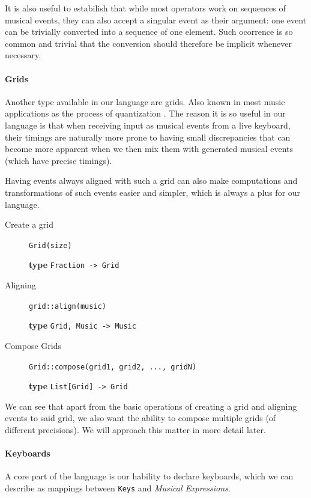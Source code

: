 \documentclass[a4paper,UKenglish,cleveref, autoref]{oasics-v2019}
\begin{document}
It is also useful to estabilish that while most operators work on sequences of musical events, they can also accept a singular event as their argument: one event can be trivially converted into a sequence of one element. Such ocorrence is so common and trivial that the conversion should therefore be implicit whenever necessary.

\paragraph*{Grids}
Another type available in our language are grids. Also known in most music applications as the process of quantization \cite{Quantization}. The reason it is so useful in our language is that when receiving input as musical events from a live keyboard, their timings are naturally more prone to having small discrepancies that can become more apparent when we then mix them with generated musical events (which have precise timings).


Having events always aligned with such a grid can also make computations and transformations of such events easier and simpler, which is always a plus for our language.


\begin{description}
    \item[Create a grid] \verb|Grid(size)|
    
        \textbf{type} \verb|Fraction -> Grid|
    \item[Aligning] \verb'grid::align(music)'
        
        \textbf{type} \verb|Grid, Music -> Music|
    \item[Compose Grids] \verb'Grid::compose(grid1, grid2, ..., gridN)'
        
        \textbf{type} \verb|List[Grid] -> Grid|
\end{description}

We can see that apart from the basic operations of creating a grid and aligning events to said grid, we also want the ability to compose multiple grids (of different precisions). We will approach this matter in more detail later.

\paragraph*{Keyboards}
A core part of the language is our hability to declare keyboards, which we can describe as mappings between \texttt{Keys} and \textit{Musical Expressions}.
\end{document}
